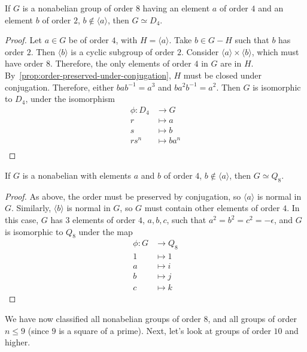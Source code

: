 \begin{proposition}
  If $G$ is a nonabelian group of order $8$ having
  an element $a$ of order $4$ and an element $b$ of order $2$,
  $b \notin \langle a \rangle$, then $G \simeq D_4$.

  \begin{proof}
    Let $a \in G$ be of order $4$, with $H = \langle a \rangle$.
    Take $b \in G - H$ such that $b$ has order $2$.
    Then $\langle b \rangle$ is a cyclic subgroup of order $2$.
    Consider $\langle a \rangle \times \langle b \rangle$,
    which must have order $8$.
    Therefore, the only elements of order $4$ in $G$ are in $H$.
    By~\ref{prop:order-preserved-under-conjugation},
    $H$ must be closed under conjugation.
    Therefore, either $bab^{-1} = a^3$ and $b a^2 b^{-1} = a^2$.
    Then $G$ is isomorphic to $D_4$, under the isomorphism
    \begin{align*}
      \phi \colon D_4 &\to G \\
      r &\mapsto a \\
      s &\mapsto b \\
      rs^n &\mapsto ba^n \\
    \end{align*}  
  \end{proof}
\end{proposition}

\begin{proposition}
  If $G$ is a nonabelian with elements $a$ and $b$ of order $4$,
  $b \notin \langle a \rangle$, then $G \simeq Q_8$.

  \begin{proof}
    As above, the order must be preserved by conjugation, so
    $\langle a \rangle$ is normal in $G$.
    Similarly, $\langle b \rangle$ is normal in $G$,
    so $G$ must contain other elements of order $4$.
    In this case, $G$ has $3$ elements of order $4$,
    $a, b, c$, such that $a^2 = b^2 = c^2 = -\epsilon$,
    and $G$ is isomorphic to $Q_8$ under the map
    \begin{align*}
      \phi \colon G &\to Q_8 \\
      1 &\mapsto 1 \\
      a &\mapsto i \\
      b &\mapsto j \\
      c &\mapsto k
    \end{align*}
  \end{proof}
\end{proposition}

We have now classified all nonabelian groups of order $8$,
and all groups of order $n \leq 9$ (since $9$ is a square of a prime).
Next, let's look at groups of order $10$ and higher.

